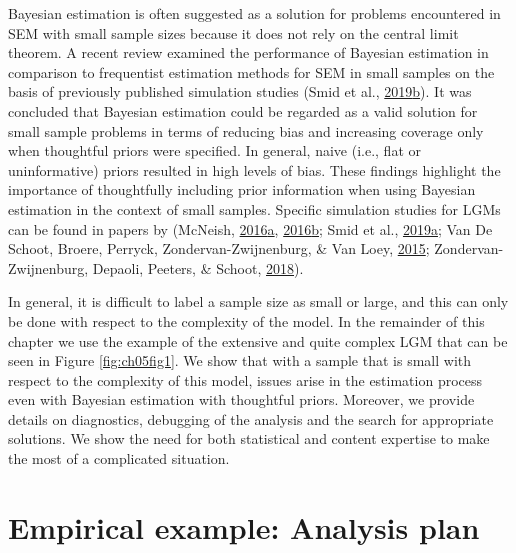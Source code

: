 \documentclass[openright,titlepage,12pt,a4paper]{book}
\begin{document}
Bayesian estimation is often suggested as a solution for problems encountered in SEM with small sample sizes because it does not rely on the central limit theorem. A recent review examined the performance of Bayesian estimation in comparison to frequentist estimation methods for SEM in small samples on the basis of previously published simulation studies (Smid et al., \protect\hyperlink{ref-smid_bayesian_2019}{2019}\protect\hyperlink{ref-smid_bayesian_2019}{b}). It was concluded that Bayesian estimation could be regarded as a valid solution for small sample problems in terms of reducing bias and increasing coverage only when thoughtful priors were specified. In general, naive (i.e., flat or uninformative) priors resulted in high levels of bias. These findings highlight the importance of thoughtfully including prior information when using Bayesian estimation in the context of small samples. Specific simulation studies for LGMs can be found in papers by (McNeish, \protect\hyperlink{ref-mcneish_using_2016}{2016}\protect\hyperlink{ref-mcneish_using_2016}{a}, \protect\hyperlink{ref-mcneish_using_2016-1}{2016}\protect\hyperlink{ref-mcneish_using_2016-1}{b}; Smid et al., \protect\hyperlink{ref-smid_predicting_2019}{2019}\protect\hyperlink{ref-smid_predicting_2019}{a}; Van De Schoot, Broere, Perryck, Zondervan-Zwijnenburg, \& Van Loey, \protect\hyperlink{ref-van_de_schoot_analyzing_2015}{2015}; Zondervan-Zwijnenburg, Depaoli, Peeters, \& Schoot, \protect\hyperlink{ref-zondervan-zwijnenburg_pushing_2018}{2018}).

In general, it is difficult to label a sample size as small or large, and this can only be done with respect to the complexity of the model. In the remainder of this chapter we use the example of the extensive and quite complex LGM that can be seen in Figure \ref{fig:ch05fig1}. We show that with a sample that is small with respect to the complexity of this model, issues arise in the estimation process even with Bayesian estimation with thoughtful priors. Moreover, we provide details on diagnostics, debugging of the analysis and the search for appropriate solutions. We show the need for both statistical and content expertise to make the most of a complicated situation.

\newpage

\hypertarget{empirical-example-analysis-plan}{%
\section{Empirical example: Analysis plan}\label{empirical-example-analysis-plan}}
\end{document}
